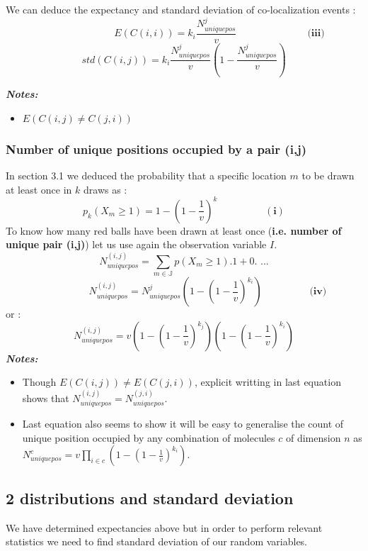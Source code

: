 \documentclass{article}
\begin{document}
We can deduce the expectancy and standard deviation of co-localization events :
\[
    \hspace{3cm}E(C(i,i)) = k_i\frac{N^j_{uniquepos}}{v} \hspace{3cm} \textbf{(iii)}
\]
\[
std(C(i,j)) = k_i\frac{N^j_{uniquepos}}{v}(1-\frac{N^j_{uniquepos}}{v})
\]

\textit{\textbf{Notes:}}
\begin{itemize}
    \item $E(C(i,j) \neq C(j,i))$
\end{itemize}

\subsubsection{Number of unique positions occupied by a pair (i,j)}
In section 3.1 we deduced the probability that a specific location $m$ to be drawn at least once  in $k$ draws as :
\[
p_k(X_m \geq 1) = 1-(1 - \frac{1}{v})^k \hspace{2cm} (\textbf{i})
\]
To know how many red balls have been drawn at least once (\textbf{i.e. number of unique pair (i,j)}) let us use again the observation
variable $I$.
\[
N^{(i,j)}_{uniquepos} = \sum_{m \in \mathbb{J}}p(X_m \geq 1).1 + 0. \textbf{ ...}
\]
\[
\hspace{2cm} N^{(i,j)}_{uniquepos} = N^j_{uniquepos}(1-(1-\frac{1}{v})^{k_i}) \hspace{2cm} \textbf{(iv)}
\]
or :
\[
N^{(i,j)}_{uniquepos} = v(1-(1-\frac{1}{v})^{k_j})(1-(1-\frac{1}{v})^{k_i})
\]
\textit{\textbf{Notes:}}
\begin{itemize}
    \item Though $E(C(i,j)) \neq E(C(j,i))$, explicit writting in last equation shows that $N^{(i,j)}_{uniquepos} = N^{(j,i)}_{uniquepos}$.
    \item Last equation also seems to show it will be easy to generalise the count of unique position occupied by any combination of molecules $c$ of dimension $n$
    as $N^c_{uniquepos} = v\prod_{i \in c}(1-(1-\frac{1}{v})^{k_i})$.
\end{itemize}



\newpage
\subsection{2 distributions and standard deviation}

We have determined expectancies above but in order to perform relevant statistics we need to find standard deviation of our random variables.
\end{document}
